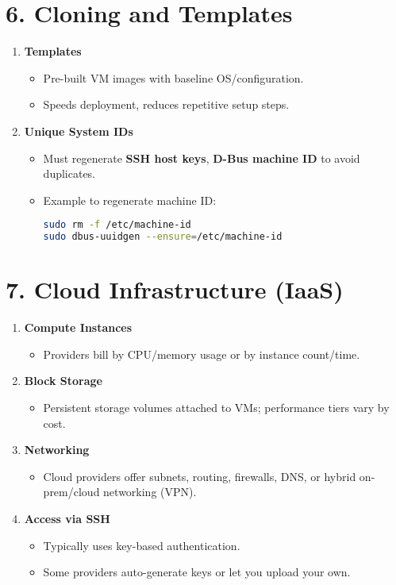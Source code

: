 \documentclass[a4paper]{report}
\begin{document}
\section*{6. Cloning and Templates}

\begin{enumerate}
    \item \textbf{Templates}
    \begin{itemize}
        \item Pre-built VM images with baseline OS/configuration.
        \item Speeds deployment, reduces repetitive setup steps.
    \end{itemize}

    \item \textbf{Unique System IDs}
    \begin{itemize}
        \item Must regenerate \textbf{SSH host keys}, \textbf{D-Bus machine ID} to avoid duplicates.
        \item Example to regenerate machine ID:
        \begin{lstlisting}[language=bash]
sudo rm -f /etc/machine-id
sudo dbus-uuidgen --ensure=/etc/machine-id
        \end{lstlisting}
    \end{itemize}
\end{enumerate}

\section*{7. Cloud Infrastructure (IaaS)}

\begin{enumerate}
    \item \textbf{Compute Instances}
    \begin{itemize}
        \item Providers bill by CPU/memory usage or by instance count/time.
    \end{itemize}

    \item \textbf{Block Storage}
    \begin{itemize}
        \item Persistent storage volumes attached to VMs; performance tiers vary by cost.
    \end{itemize}

    \item \textbf{Networking}
    \begin{itemize}
        \item Cloud providers offer subnets, routing, firewalls, DNS, or hybrid on-prem/cloud networking (VPN).
    \end{itemize}

    \item \textbf{Access via SSH}
    \begin{itemize}
        \item Typically uses key-based authentication.
        \item Some providers auto-generate keys or let you upload your own.
    \end{itemize}
\end{enumerate}
\end{document}
